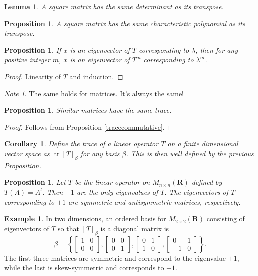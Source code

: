 \documentclass[12pt]{article}
\theoremstyle{plain}
\newtheorem{corollary}[theorem]{Corollary}
\newtheorem{lemma}[theorem]{Lemma}
\newtheorem{proposition}[theorem]{Proposition}
\theoremstyle{definition}
\newtheorem{example}[theorem]{Example}
\theoremstyle{remark}
\newtheorem{note}[theorem]{Note}
\newcommand{\R}{\mathbf R}
\DeclareMathOperator{\tr}{tr}
\begin{document}
\begin{lemma}
A square matrix has the same determinant as its transpose.
\end{lemma}

\begin{proposition}
A square matrix has the same characteristic polynomial as its transpose.
\end{proposition}

\begin{proposition}
If $x$ is an eigenvector of $T$ corresponding to $\lambda$, then for any positive integer $m$, $x$ is an eigenvector of $T^m$ corresponding to $\lambda^m$.
\end{proposition}

\begin{proof}
Linearity of $T$ and induction.
\end{proof}

\begin{note}
The same holds for matrices. It's always the same!
\end{note}

\begin{proposition}
Similar matrices have the same trace.
\end{proposition}

\begin{proof}
Follows from Proposition \ref{tracecommutative}.
\end{proof}

\begin{corollary}
Define the trace of a linear operator $T$ on a finite dimensional vector space as $\tr [T]_\beta$ for any basis $\beta$. This is then well defined by the previous Proposition.
\end{corollary}

\begin{proposition}
Let $T$ be the linear operator on $M_{n\times n}(\R)$ defined by $T(A) = A^t.$ Then $\pm 1$ are the only eigenvalues of $T.$ The eigenvectors of $T$ corresponding to $\pm 1$ are symmetric and antisymmetric matrices, respectively.
\end{proposition}

\begin{example}
In two dimensions, an ordered basis for $M_{2 \times 2}(\R)$ consisting of eigenvectors of $T$ so that $[T]_\beta$ is a diagonal matrix is 
$$\beta = \left\{ 
\begin{bmatrix}
1 & 0 \\
0 & 0
\end{bmatrix},
\begin{bmatrix}
0 & 0 \\
0 & 1
\end{bmatrix},
\begin{bmatrix}
0 & 1 \\
1 & 0
\end{bmatrix},
\begin{bmatrix}
0 & 1 \\
-1 & 0
\end{bmatrix}
\right\}.$$
The first three matrices are symmetric and correspond to the eigenvalue $+1$, while the last is skew-symmetric and corresponds to $-1.$
\end{example}
\end{document}
